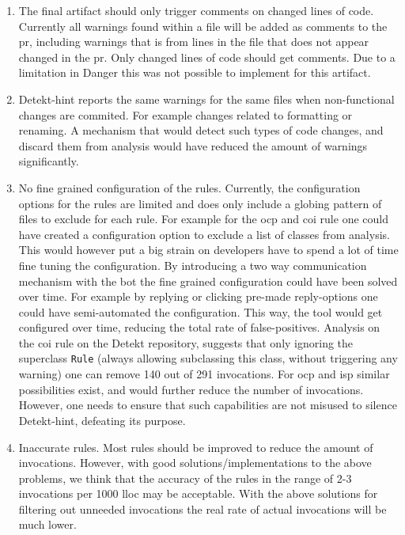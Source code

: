 \documentclass{report}
\begin{document}
\begin{enumerate}

    \item The final artifact should only trigger comments on changed lines of code. Currently all warnings found within a file will be added as comments to the \gls{pr}, including warnings that is from lines in the file that does not appear changed in the \gls{pr}. Only changed lines of code should get comments. Due to a limitation in Danger this was not possible to implement for this artifact.
    
    \item Detekt-hint reports the same warnings for the same files when non-functional changes are commited. For example changes related to formatting or renaming. A mechanism that would detect such types of code changes, and discard them from analysis would have reduced the amount of warnings significantly.
    
    \item No fine grained configuration of the rules. Currently, the configuration options for the rules are limited and does only include a globing pattern of files to exclude for each rule. For example for the \gls{ocp} and \gls{coi} rule one could have created a configuration option to exclude a list of classes from analysis. This would however put a big strain on developers have to spend a lot of time fine tuning the configuration. By introducing a two way communication mechanism with the bot the fine grained configuration could have been solved over time. For example by replying or clicking pre-made reply-options one could have semi-automated the configuration. This way, the tool would get configured over time, reducing the total rate of false-positives. Analysis on the \gls{coi} rule on the Detekt repository, suggests that only ignoring the superclass \texttt{Rule} (always allowing subclassing this class, without triggering any warning) one can remove 140 out of 291 invocations. For \gls{ocp} and \gls{isp} similar possibilities exist, and would further reduce the number of invocations. However, one needs to ensure that such capabilities are not misused to silence Detekt-hint, defeating its purpose.
    
    \item Inaccurate rules. Most rules should be improved to reduce the amount of invocations. However, with good solutions/implementations to the above problems, we think that the accuracy of the rules in the range of 2-3 invocations per 1000 \gls{lloc} may be acceptable. With the above solutions for filtering out unneeded invocations the real rate of actual invocations will be much lower.
\end{enumerate}
\end{document}
